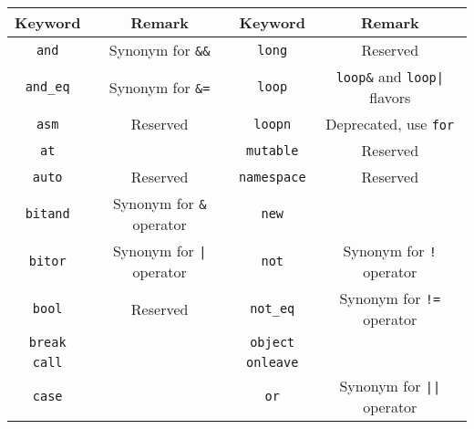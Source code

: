 \renewcommand{\baselinestretch}{.85}
\begin{table}[\floatpos]
  \centering
  \begin{tabular}{|c|c||c|c|}
    \hline
    Keyword                       & Remark                                  &
    Keyword                       & Remark                                  \\
    \hline
    \lstinline"and"               & Synonym for \lstinline|&&|              &
    \lstinline"long"              & Reserved                                \\
    \lstinline"and_eq"            & Synonym for \lstinline|&=|              &
    \lstinline"loop"              & \lstinline|loop&| and
                                    \lstinline-loop|- flavors               \\
    \lstinline"asm"               & Reserved                                &
    \lstinline"loopn"             & Deprecated, use \lstinline|for|         \\
    \lstinline"at"                &                                         &
    \lstinline"mutable"           & Reserved                                \\
    \lstinline"auto"              & Reserved                                &
    \lstinline"namespace"         & Reserved                                \\
    \lstinline"bitand"            & Synonym for \lstinline|&| operator      &
    \lstinline"new"               &                                         \\
    \lstinline"bitor"             & Synonym for \lstinline-|- operator      &
    \lstinline"not"               & Synonym for \lstinline|!| operator      \\
    \lstinline"bool"              & Reserved                                &
    \lstinline"not_eq"            & Synonym for \lstinline|!=| operator     \\
    \lstinline"break"             &                                         &
    \lstinline"object"            &                                         \\
    \lstinline"call"              &                                         &
    \lstinline"onleave"           &                                         \\
    \lstinline"case"              &                                         &
    \lstinline"or"                & Synonym for \lstinline-||- operator     \\

\end{tabular}
\end{table}
